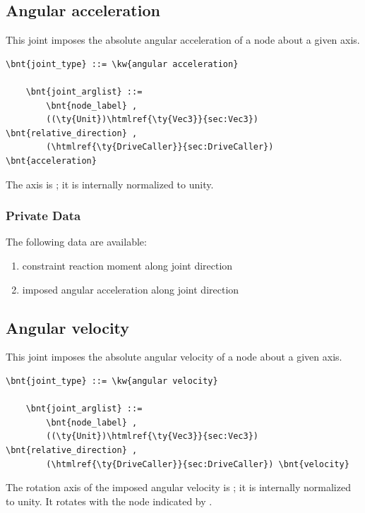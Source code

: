 \subsection{Angular acceleration}
This joint imposes the absolute angular acceleration of a node
about a given axis.
\begin{Verbatim}[commandchars=\\\{\}]
    \bnt{joint_type} ::= \kw{angular acceleration}

    \bnt{joint_arglist} ::=
        \bnt{node_label} ,
        ((\ty{Unit})\htmlref{\ty{Vec3}}{sec:Vec3}) \bnt{relative_direction} , 
        (\htmlref{\ty{DriveCaller}}{sec:DriveCaller}) \bnt{acceleration}
\end{Verbatim}
The axis is ; it is internally normalized to unity.

\subsubsection{Private Data}
The following data are available:
\begin{enumerate}
\item {} constraint reaction moment along joint direction
\item {} imposed angular acceleration along joint direction
\end{enumerate}



\subsection{Angular velocity}
This joint imposes the absolute angular velocity of a node
about a given axis.
\begin{Verbatim}[commandchars=\\\{\}]
    \bnt{joint_type} ::= \kw{angular velocity}

    \bnt{joint_arglist} ::=
        \bnt{node_label} ,
        ((\ty{Unit})\htmlref{\ty{Vec3}}{sec:Vec3}) \bnt{relative_direction} , 
        (\htmlref{\ty{DriveCaller}}{sec:DriveCaller}) \bnt{velocity}
\end{Verbatim}
The rotation axis of the imposed angular velocity is ;
it is internally normalized to unity.
It rotates with the node indicated by .


